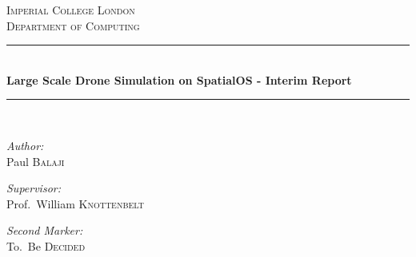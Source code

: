 \documentclass[12pt,titlepage]{article}
\begin{document}
\begin{titlepage}

\newcommand{\HRule}{\rule{\linewidth}{0.5mm}} %
\setlength{\topmargin}{0in}
\center %



\textsc{\LARGE Imperial College London}\\[1.5cm] %
\textsc{\Large Department of Computing}\\[0.5cm] %


\HRule \\[0.4cm]
{ \huge \bfseries Large Scale Drone Simulation on SpatialOS - Interim Report}\\[0.4cm] %
\HRule \\[1cm]


\begin{minipage}[t]{0.4\textwidth}
\begin{flushleft} \large
\emph{Author:}\\
Paul \textsc{Balaji} \\
\end{flushleft}
\end{minipage}
\begin{minipage}[t]{0.5\textwidth}
\begin{flushright} \large
\emph{Supervisor:} \\
Prof.~William \textsc{Knottenbelt}
\end{flushright}
\begin{flushright} \large
\emph{Second Marker:} \\
To.~Be \textsc{Decided}
\end{flushright}
\end{minipage}\\[1cm]




\vfill %

\end{titlepage}
\end{document}
